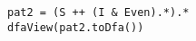 \begin{lstlisting}[style=reclojureScala]
pat2 = (S ++ (I & Even).*).*
dfaView(pat2.toDfa())
\end{lstlisting}
